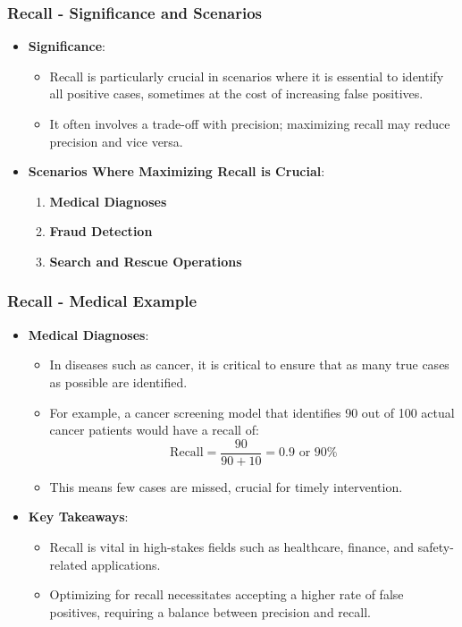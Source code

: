 \documentclass[aspectratio=169]{beamer}
\begin{document}
\begin{frame}[fragile]
    \frametitle{Recall - Significance and Scenarios}
    \begin{itemize}
        \item \textbf{Significance}:
        \begin{itemize}
            \item Recall is particularly crucial in scenarios where it is essential to identify all positive cases, sometimes at the cost of increasing false positives.
            \item It often involves a trade-off with precision; maximizing recall may reduce precision and vice versa.
        \end{itemize}
        
        \item \textbf{Scenarios Where Maximizing Recall is Crucial}:
        \begin{enumerate}
            \item \textbf{Medical Diagnoses}
            \item \textbf{Fraud Detection}
            \item \textbf{Search and Rescue Operations}
        \end{enumerate}
    \end{itemize}
\end{frame}

\begin{frame}[fragile]
    \frametitle{Recall - Medical Example}
    \begin{itemize}
        \item \textbf{Medical Diagnoses}:
        \begin{itemize}
            \item In diseases such as cancer, it is critical to ensure that as many true cases as possible are identified. 
            \item For example, a cancer screening model that identifies 90 out of 100 actual cancer patients would have a recall of:
            \begin{equation}
                \text{Recall} = \frac{90}{90 + 10} = 0.9 \text{ or } 90\%
            \end{equation}
            \item This means few cases are missed, crucial for timely intervention.
        \end{itemize}
        
        \item \textbf{Key Takeaways}:
        \begin{itemize}
            \item Recall is vital in high-stakes fields such as healthcare, finance, and safety-related applications.
            \item Optimizing for recall necessitates accepting a higher rate of false positives, requiring a balance between precision and recall.
        \end{itemize}
    \end{itemize}
\end{frame}
\end{document}
